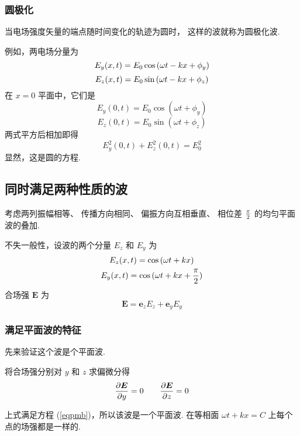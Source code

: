 \documentclass[UTF8,linespread=1.236]{ctexart}
\newcommand\myref[1]{(\ref{#1})}
\newcommand\cu[1]{\boldsymbol{#1}}
\newcommand\vecE{\cu{E}}
\newcommand\pypx[2]{{{\partial {#1}} \over {\partial {#2}}}}
\begin{document}
\subsubsection{圆极化}

当电场强度矢量的端点随时间变化的轨迹为圆时，
这样的波就称为圆极化波.

例如，两电场分量为
\begin{equation}
    E_y(x,t) = E_0\cos{(\omega t - kx + \phi_{y})}
\end{equation}
\begin{equation}
    E_z(x,t) = E_0\sin{(\omega t - kx + \phi_{z})}
\end{equation}
在 $x = 0$ 平面中，它们是
\begin{equation}
    E_y(0,t) = E_0\cos{(\omega t + \phi_y)}
\end{equation}
\begin{equation}
    E_z(0,t) = E_0\sin{(\omega t + \phi_z)}
\end{equation}
两式平方后相加即得
\begin{equation}
    E_y^2(0,t) + E_z^2(0,t) = E_0^2
\end{equation}
显然，这是圆的方程.

\subsection{同时满足两种性质的波}

考虑两列振幅相等、
传播方向相同、
偏振方向互相垂直、
相位差 $\pi \over 2$ 的均匀平面波的叠加.

不失一般性，设波的两个分量 $E_z$ 和 $E_y$ 为
\begin{gather}
    E_z(x,t) = \cos{(\omega t + kx)} \\
    E_y(x,t) = \cos{(\omega t + kx + {\pi \over 2})}
\end{gather}
合场强 $\vecE$ 为
\begin{equation}
    \vecE = \cu{e}_zE_z + \cu{e}_yE_y
\end{equation}

\subsubsection{满足平面波的特征}
先来验证这个波是个平面波.

将合场强分别对 $y$ 和 $z$ 求偏微分得
\begin{equation}
    \pypx{\vecE}{y} = 0 \qquad \pypx{\vecE}{z} = 0
\end{equation}

上式满足方程 \myref{eqpmb}，所以该波是一个平面波.
在等相面 $\omega t + kx = C$ 上每个点的场强都是一样的.

\clearpage
\end{document}
